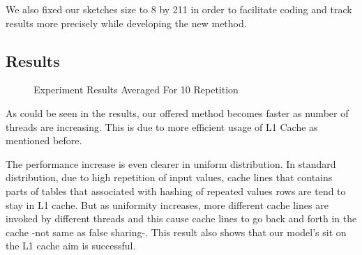 \documentclass[twoside]{article}
\begin{document}
We also fixed our sketches size to 8 by 211 in order to facilitate coding and track results more precisely while developing the new method.

\subsection{Results}

\begin{figure}[H]
	\centering
	\caption{Experiment Results Averaged For 10 Repetition}
\end{figure}

\par As could be seen in the results, our offered method becomes faster as number of threads are increasing. This is due to more efficient usage of L1 Cache as mentioned before.

\par The performance increase is even clearer in uniform distribution. In standard distribution, due to high repetition of input values, cache lines that contains parts of tables that associated with hashing of repeated values rows are tend to stay in L1 cache. But as uniformity increases, more different cache lines are invoked by different threads and this cause cache lines to go back and forth in the cache -not same as false sharing-. This result also shows that our model's sit on the L1 cache aim is successful.
\end{document}
